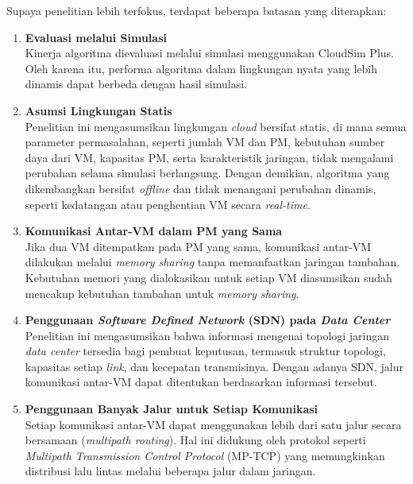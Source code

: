 Supaya penelitian lebih terfokus, terdapat beberapa batasan yang diterapkan:

\begin{enumerate}
  \item \textbf{Evaluasi melalui Simulasi} \\
  Kinerja algoritma dievaluasi melalui simulasi menggunakan CloudSim Plus. Oleh karena itu, performa algoritma dalam lingkungan nyata yang lebih dinamis dapat berbeda dengan hasil simulasi.
  \item \textbf{Asumsi Lingkungan Statis} \\
  Penelitian ini mengasumsikan lingkungan \textit{cloud} bersifat statis, di mana semua parameter permasalahan, seperti jumlah VM dan PM, kebutuhan sumber daya dari VM, kapasitas PM, serta karakteristik jaringan, tidak mengalami perubahan selama simulasi berlangsung. Dengan demikian, algoritma yang dikembangkan bersifat \textit{offline} dan tidak menangani perubahan dinamis, seperti kedatangan atau penghentian VM secara \textit{real-time}.
  \item \textbf{Komunikasi Antar-VM dalam PM yang Sama} \\
  Jika dua VM ditempatkan pada PM yang sama, komunikasi antar-VM dilakukan melalui \textit{memory sharing} tanpa memanfaatkan jaringan tambahan. Kebutuhan memori yang dialokasikan untuk setiap VM diasumsikan sudah mencakup kebutuhan tambahan untuk \textit{memory sharing}.
  \item \textbf{Penggunaan \textit{Software Defined Network} (SDN) pada \textit{Data Center}} \\
  Penelitian ini mengasumsikan bahwa informasi mengenai topologi jaringan \textit{data center} tersedia bagi pembuat keputusan, termasuk struktur topologi, kapasitas setiap \textit{link}, dan kecepatan transmisinya.	Dengan adanya SDN, jalur komunikasi antar-VM dapat ditentukan berdasarkan informasi tersebut.
  \item \textbf{Penggunaan Banyak Jalur untuk Setiap Komunikasi} \\
  Setiap komunikasi antar-VM dapat menggunakan lebih dari satu jalur secara bersamaan (\textit{multipath routing}). Hal ini didukung oleh protokol seperti \textit{Multipath Transmission Control Protocol} (MP-TCP) yang memungkinkan distribusi lalu lintas melalui beberapa jalur dalam jaringan.
\end{enumerate}
